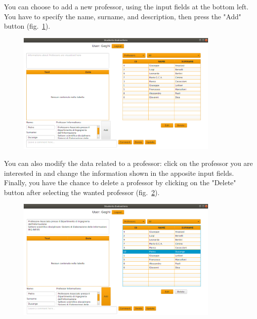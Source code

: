 \documentclass[a4paper]{article}
\begin{document}
You can choose to add a new professor, using the input fields at the bottom left. You have to specify the name, surname, and description, then press the "Add" button (fig.~\ref{fig:admin1}).
\begin{figure}[h]
\centering
\includegraphics[width=0.88\textwidth]{images/screens/admin1}
\label{fig:admin1}
\end{figure}
\clearpage
You can also modify the data related to a professor: click on the professor you are interested in and change the information shown in the apposite input fields. Finally, you have the chance to delete a professor by clicking on the "Delete" button after selecting the wanted professor (fig.~\ref{fig:admin2}).
\begin{figure}[h]
\centering
\includegraphics[width=0.88\textwidth]{images/screens/admin2}
\label{fig:admin2}
\end{figure}
\end{document}
